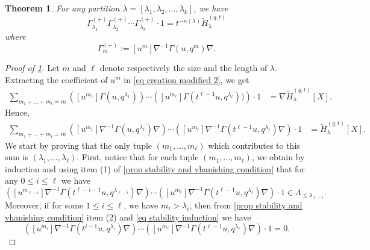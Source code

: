 \documentclass[10pt,a4paper]{amsart}
\newtheorem{thm}{Theorem}
\newcommand{\Gammaplus}[1]{ {  \Gamma}^{(+)}_{#1}}
\newcommand{\tH}{\widetilde{H}^{(q,t)}}
\begin{document}
\begin{thm} \label{thm creation modified}
	For any partition $\lambda=[\lambda_1,\lambda_2,\dots,\lambda_k]$, we have
	\begin{equation}\label{eq thm creation modified}
		\Gammaplus{\lambda_1}\Gammaplus{\lambda_2}\cdots\Gammaplus{\lambda_k}\cdot1=t^{-n(\lambda)}\tH_{\lambda}
  \end{equation}
  \noindent where
  $$\Gammaplus{m}:=[u^m]\nabla^{-1}\Gamma(u,q^m)\nabla.$$
\end{thm}

\begin{proof}[Proof of \cref{thm creation modified}]
    Let $m$ and $\ell$ denote respectively the size and the length of $\lambda$. Extracting the coefficient of $u^m$ in  \cref{eq creation modified 2}, we get 
\begin{align}
	\sum_{m_1+\dots+m_\ell=m}\left([u^{m_1}]\Gamma(u,q^{\lambda_1})\right)\cdots \left([u^{m_\ell}]\Gamma(t^{\ell-1}u,q^{\lambda_{\ell}}))\right)\cdot 1 & =\nabla \tH_\lambda[X].
\end{align}
Hence,
\begin{align}\label{eq formula modified}	\sum_{m_1+\dots+m_\ell=m}\left([u^{m_1}]\nabla^{-1}\Gamma(u,q^{\lambda_1})\nabla\right)\cdots \left([u^{m_\ell}]\nabla^{-1}\Gamma(t^{\ell-1}u,q^{\lambda_{\ell}})\nabla\right)\cdot 1 & =\tH_\lambda[X].
\end{align}
We start by proving that the only tuple $(m_1,\dots,m_\ell)$ which contributes to this sum is $(\lambda_1,\dots,\lambda_\ell).$
First, notice that for each tuple $(m_1,\dots,m_{\ell})$, we obtain by induction and using item (1) of \cref{prop stability and vhanishing condition} that for any $0\leq i \leq \ell$ we have
\begin{equation}\label{eq stability induction}
  \left([u^{m_{\ell-i}}]\nabla^{-1}\Gamma(t^{\ell-i-1}u,q^{\lambda_{\ell-i}})\nabla\right)\cdots \left([u^{m_\ell}]\nabla^{-1}\Gamma(t^{\ell-1}u,q^{\lambda_{\ell}})\nabla\right)\cdot 1\in \Lambda_{\leq \lambda_{\ell-i}}.  
\end{equation}
Moreover, if for some $1\leq i\leq \ell$, we have $m_i>\lambda_i$, then from \cref{prop stability and vhanishing condition} item (2) and \cref{eq stability induction} we have  
\begin{equation}
  \left([u^{m_{i}}]\nabla^{-1}\Gamma(t^{i-1}u,q^{\lambda_{i}})\nabla\right)\cdots \left([u^{m_\ell}]\nabla^{-1}\Gamma(t^{\ell-1}u,q^{\lambda_{\ell}})\nabla\right)\cdot 1=0.  
\end{equation}

\end{proof}
\end{document}
